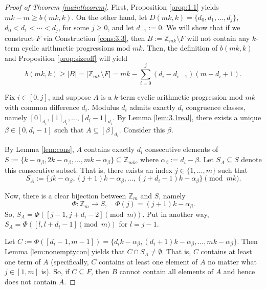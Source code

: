 \documentclass{article}
\theoremstyle{definition}
\theoremstyle{remark}
\begin{document}
\begin{proof}[Proof of Theorem \ref{maintheorem}] First, Proposition \ref{prop:1.1} yields $mk - m \geq b(mk,k)$. On the other hand, let $D(mk,k) = \{d_0,d_1,\ldots,d_{j}\}$, $d_0 < d_1 < \cdots < d_{j}$, for some $j \geq 0$, and let $d_{-1} := 0$. We will show that if we construct $F$ via Construction \ref{cons:3.3}, then $B := \mathbb{Z}_{mk} \setminus F$ will not contain any $k$-term cyclic arithmetic progressions mod $mk$. Then, the definition of $b(mk,k)$ and Proposition \ref{prop:sizeoff} will yield \begin{equation*}
    b(mk,k) \geq |B| = |\mathbb{Z}_{mk} \setminus F| = mk-\sum_{i=0}^{j}(d_i-d_{i-1})(m-d_{i}+1).
\end{equation*}

Fix $i \in [0,j]$, and suppose $A$ is a $k$-term cyclic arithmetic progression mod $mk$ with common difference $d_i$. Modulus $d_i$ admits exactly $d_i$ congruence classes, namely $[0]_{d_i},[1]_{d_{i}},\ldots,[d_{i}-1]_{d_{i}}$. By Lemma \ref{lem:3.1real}, there exists a unique $\beta \in [0,d_i-1]$ such that $A \subseteq [\beta]_{d_{i}}$. Consider this $\beta$.

By Lemma \ref{lem:cons}, $A$ contains exactly $d_{i}$ consecutive elements of $S := \{k-\alpha_\beta,2k-\alpha_\beta,\ldots,mk-\alpha_\beta\} \subseteq \mathbb{Z}_{mk}$, where $\alpha_\beta := d_{i} - \beta$. Let $S_A \subseteq S$ denote this consecutive subset. That is, there exists an index $j \in \{1,\ldots,m\}$ such that \begin{equation*}
    S_A := \{jk-\alpha_\beta,(j+1)k-\alpha_\beta,\ldots,(j+d_i-1)k-\alpha_\beta\} \pmod {mk}.
\end{equation*}

Now, there is a clear bijection between $\mathbb{Z}_m$ and $S$, namely \begin{equation*}
    \Phi : \mathbb{Z}_m \to S, \quad \Phi(j) = (j+1)k-\alpha_\beta.
\end{equation*} So, $S_{A} = \Phi([j-1,j+d_i-2] \pmod m)$. Put in another way, $S_A = \Phi([l,l+d_i-1] \pmod m)$ for $l=j-1$.

Let $C := \Phi([d_i-1,m-1]) = \{d_ik-\alpha_\beta,(d_{i}+1)k-\alpha_\beta,\ldots,mk-\alpha_\beta\}$. Then Lemma \ref{lem:nonemptycon} yields that $C \cap S_A \neq \emptyset$. That is, $C$ contains at least one term of $A$ (specifically, $C$ contains at least one element of $A$ no matter what $j \in [1,m]$ is). So, if $C \subseteq F$, then $B$ cannot contain all elements of $A$ and hence does not contain $A$. 


\end{proof}
\end{document}
